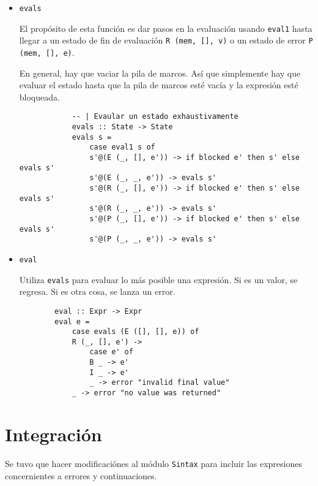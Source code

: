\documentclass{article}
\newcommand{\tx}[1]{\texttt{#1}}
\begin{document}
\begin{itemize}
\begin{itemize}
        \end{itemize}
        \item\tx{evals}

        El propósito de esta función es dar pasos en la evaluación usando 
        \tx{eval1} hasta llegar a un estado de fin de evaluación 
        \tx{R (mem, [], v)} o un estado de error \tx{P (mem, [], e)}.

        En general, hay que vaciar la pila de marcos. Así que simplemente hay 
        que evaluar el estado hasta que la pila de marcos esté vacía y la 
        expresión esté bloqueada.

        \begin{verbatim}
            -- | Evaular un estado exhaustivamente
            evals :: State -> State
            evals s = 
                case eval1 s of
                s'@(E (_, [], e')) -> if blocked e' then s' else evals s'
                s'@(E (_, _, e')) -> evals s'
                s'@(R (_, [], e')) -> if blocked e' then s' else evals s'
                s'@(R (_, _, e')) -> evals s'
                s'@(P (_, [], e')) -> if blocked e' then s' else evals s'
                s'@(P (_, _, e')) -> evals s'
        \end{verbatim}
        \item \tx{eval}

        Utiliza \tx{evals} para evaluar lo más posible una expresión. Si es un 
        valor, se regresa. Si es otra cosa, se lanza un error.

        \begin{verbatim}
        eval :: Expr -> Expr
        eval e = 
            case evals (E ([], [], e)) of
            R (_, [], e') -> 
                case e' of
                B _ -> e'
                I _ -> e'
                _ -> error "invalid final value"
            _ -> error "no value was returned"
        \end{verbatim}
    \end{itemize}

    \section{Integración}

    Se tuvo que hacer modificaciónes al módulo \tx{Sintax} para incluir las 
    expresiones concernientes a errores y continuaciones.
\end{document}
